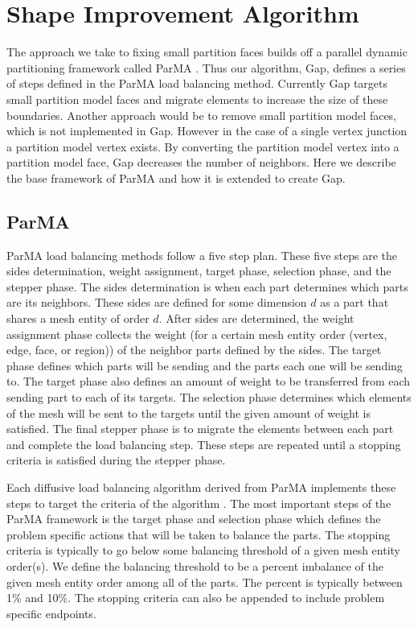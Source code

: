 \documentclass{thesis}
\begin{document}
\chapter{Shape Improvement Algorithm}

The approach we take to fixing small partition faces builds off a parallel 
dynamic partitioning framework called ParMA \cite{parma}. Thus our algorithm, 
Gap, defines a series of steps defined in the ParMA load balancing method. 
Currently Gap targets small partition model faces and migrate elements to 
increase the size of these boundaries. Another approach would be to remove 
small partition model faces, which is not implemented in Gap. However in the 
case of a single vertex junction a partition model vertex exists. By converting 
the partition model vertex into a partition model face, Gap decreases the 
number of neighbors. Here we describe the base framework of ParMA and how it 
is extended to create Gap.

\section{ParMA}

ParMA load balancing methods follow a five step plan. These five steps 
are the sides determination, weight assignment, target phase, selection
phase, and the stepper phase. The sides determination is when each part 
determines which parts are its neighbors. These sides are defined for some
 dimension $d$ as a part that shares a mesh entity of order $d$. After sides are 
determined, the weight assignment phase collects the weight (for a certain 
mesh entity order (vertex, edge, face, or region)) of the neighbor parts 
defined by the sides. The 
target phase defines which parts will be sending and the parts each one 
will be sending to. The target phase also defines an amount of weight to 
be transferred from each sending part to each of its targets. The selection 
phase determines which elements of the mesh will be sent to the targets 
until the given amount of weight is satisfied. The final stepper phase is 
to migrate the elements between each part and complete the load balancing 
step. These steps are repeated until a stopping criteria is satisfied 
during the stepper phase. 

Each diffusive load balancing algorithm derived from ParMA implements these 
steps to target the criteria of the algorithm \cite{parma}. The most important 
steps of the ParMA framework is the target phase and selection phase which 
defines the problem specific actions that will be taken to balance the parts. 
The stopping criteria is typically to go below some balancing threshold of 
a given mesh entity order(s). We define the balancing threshold to be a 
percent imbalance of the given mesh entity order among all of the parts.
The percent is typically between 1\% and 10\%. The stopping criteria can also 
be appended to include problem specific endpoints.
 
\end{document}
